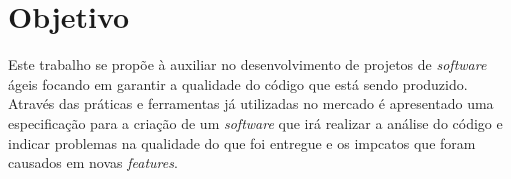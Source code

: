 \chapter{Objetivo}
Este trabalho se propõe à auxiliar no desenvolvimento de projetos de \textit{software}
ágeis focando em garantir a qualidade do código que está sendo produzido. \newline
Através das práticas e ferramentas já utilizadas no mercado é apresentado uma
especificação para a criação de um \textit{software} que irá realizar a análise
do código e indicar problemas na qualidade do que foi entregue e os impcatos que
foram causados em novas \textit{features}.
